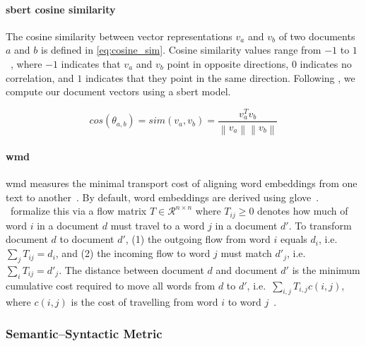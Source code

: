 \paragraph{\acs{sbert} cosine similarity}
The cosine similarity between vector representations $v_a$ and $v_b$ of two documents $a$ and $b$ is defined in \autoref{eq:cosine_sim}. 
Cosine similarity values range from $-1$ to $1$~\citep{thongtan_cosine_sim_19,zhang_bertscore_2020}, where $-1$ indicates that $v_a$ and $v_b$ point in opposite directions, $0$ indicates no correlation, and $1$ indicates that they point in the same direction. 
Following \citet{gohsen_captions_2023}, we compute our document vectors using a \ac{sbert} model.

\begin{equation}
    cos(\theta_{a,b})=sim(v_a,v_b)=\frac{v_a^Tv_b}{\left\| v_a \right\|\left\| v_b \right\|}
    \label{eq:cosine_sim}
\end{equation}


\paragraph{\ac{wmd}}
\ac{wmd} measures the minimal transport cost of aligning word embeddings from one text to another~\citep{gohsen_captions_2023}. 
By default, word embeddings are derived using \acs{glove}~\citep{glove_wmd_2014}.
\citet{kusner_wmd_15}\ formalize this via a flow matrix $T \in \mathcal{R}^{n \times n}$ where $T_{ij} \geq 0$ denotes how much of word $i$ in a document $d$ must travel to a word $j$ in a document $d'$.
To transform document $d$ to document $d'$, (1) the outgoing flow from word $i$ equals $d_i$, i.e.\ $\sum_{j}T_{ij}=d_i$, and (2) the incoming flow to word $j$ must match $d'_j$, i.e.\ $\sum_{i}T_{ij}=d'_j$.
The distance between document $d$ and document $d'$ is the minimum cumulative cost required to move all words from $d$ to $d'$, i.e.\ $\sum_{i,j}T_{i,j}c(i,j)$, where $c(i,j)$ is the cost of travelling from word $i$ to word $j$~\citep{kusner_wmd_15}.


\subsubsection{Semantic–Syntactic Metric}

